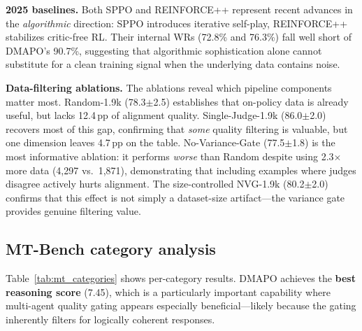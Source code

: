 \documentclass{article}
\newcommand{\method}{DMAPO}
\newcommand{\res}[2]{#1{\scriptsize$\pm$#2}}
\begin{document}
\textbf{2025 baselines.} Both SPPO and REINFORCE++ represent recent advances in the \emph{algorithmic} direction: SPPO introduces iterative self-play, REINFORCE++ stabilizes critic-free RL. Their internal WRs (72.8\% and 76.3\%) fall well short of \method{}'s 90.7\%, suggesting that algorithmic sophistication alone cannot substitute for a clean training signal when the underlying data contains noise.

\textbf{Data-filtering ablations.} The ablations reveal which pipeline components matter most. Random-1.9k (\res{78.3}{2.5}) establishes that on-policy data is already useful, but lacks 12.4\,pp of alignment quality. Single-Judge-1.9k (\res{86.0}{2.0}) recovers most of this gap, confirming that \emph{some} quality filtering is valuable, but one dimension leaves 4.7\,pp on the table. No-Variance-Gate (\res{77.5}{1.8}) is the most informative ablation: it performs \emph{worse} than Random despite using 2.3$\times$ more data (4,297 vs.\ 1,871), demonstrating that including examples where judges disagree actively hurts alignment. The size-controlled NVG-1.9k (\res{80.2}{2.0}) confirms that this effect is not simply a dataset-size artifact---the variance gate provides genuine filtering value.

\subsection{MT-Bench category analysis}

Table~\ref{tab:mt_categories} shows per-category results. \method{} achieves the \textbf{best reasoning score} (7.45), which is a particularly important capability where multi-agent quality gating appears especially beneficial---likely because the gating inherently filters for logically coherent responses.
\end{document}
